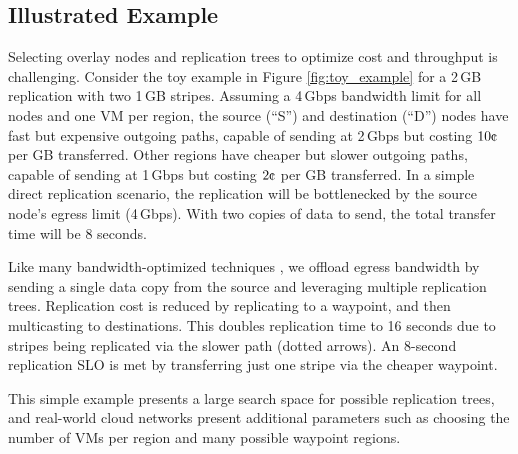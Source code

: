 \subsection{Illustrated Example}
Selecting overlay nodes and replication trees to optimize cost and throughput is challenging.
Consider the toy example in Figure \ref{fig:toy_example} for a 2\,GB replication with two 1\,GB stripes.
Assuming a 4\,Gbps bandwidth limit for all nodes and one VM per region, the source (``S'') and destination (``D'') nodes have fast but expensive outgoing paths, capable of sending at 2\,Gbps but costing $10\mbox{\textcent}$ per GB transferred.
Other regions have cheaper but slower outgoing paths, capable of sending at 1\,Gbps but costing $2\mbox{\textcent}$ per GB transferred.
In a simple direct replication scenario, the replication will be bottlenecked by the source node's egress limit (4\,Gbps). With two copies of data to send, the total transfer time will be 8 seconds.

Like many bandwidth-optimized techniques \cite{castro2003splitstream, ganguly2005fast,kostic2003bullet}, we offload egress bandwidth by sending a single data copy from the source and leveraging multiple replication trees. Replication cost is reduced by replicating to a waypoint, and then multicasting to destinations. This doubles replication time to 16 seconds due to stripes being replicated via the slower path (dotted arrows). An 8-second replication SLO is met by transferring just one stripe via the cheaper waypoint.

This simple example presents a large search space for possible replication trees, and real-world cloud networks present additional parameters such as choosing the number of VMs per region and many possible waypoint regions.
